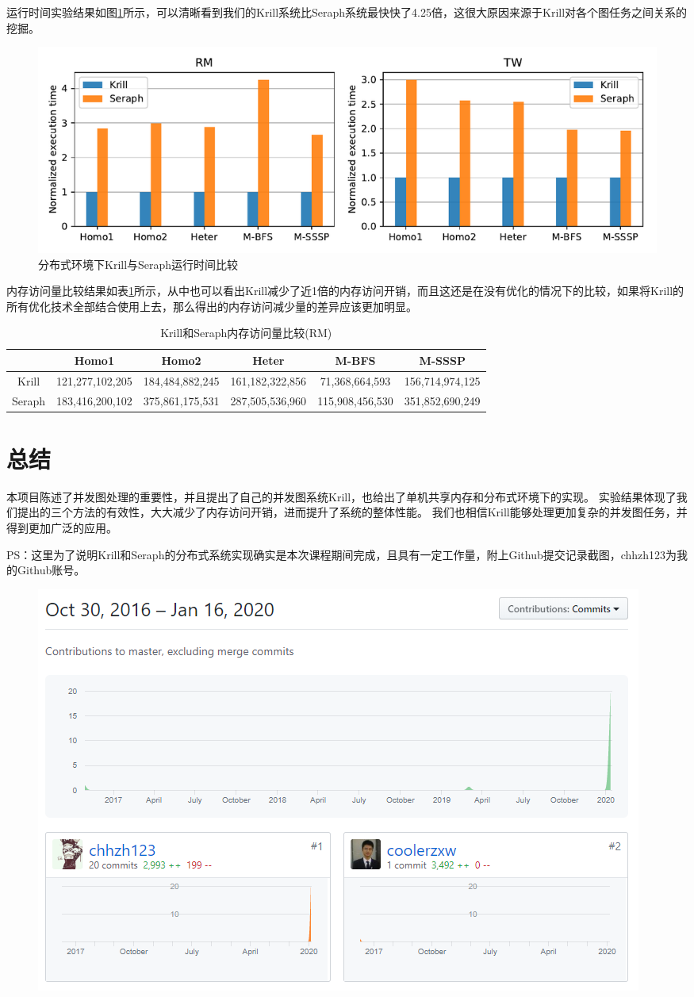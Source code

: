 \documentclass[logo,reportComp]{thesis}
\begin{document}
运行时间实验结果如图\ref{fig:distributed}所示，可以清晰看到我们的Krill系统比Seraph系统最快快了4.25倍，这很大原因来源于Krill对各个图任务之间关系的挖掘。
\begin{figure}[H]
\centering
\includegraphics[width=0.9\linewidth]{fig/distributed.pdf}
\caption{分布式环境下Krill与Seraph运行时间比较}
\label{fig:distributed}
\end{figure}

内存访问量比较结果如表\ref{tab:memory}所示，从中也可以看出Krill减少了近1倍的内存访问开销，而且这还是在没有优化的情况下的比较，如果将Krill的所有优化技术全部结合使用上去，那么得出的内存访问减少量的差异应该更加明显。
\begin{table}[H]
\caption{Krill和Seraph内存访问量比较(RM)}
\label{tab:memory}
\begin{tabular}{cccccc}\hline
& \textbf{Homo1} & \textbf{Homo2} & \textbf{Heter} & \textbf{M-BFS} & \textbf{M-SSSP}\\\hline
Krill & 121,277,102,205 & 184,484,882,245 & 161,182,322,856 & 71,368,664,593 & 156,714,974,125\\
Seraph & 183,416,200,102 & 375,861,175,531 & 287,505,536,960 & 115,908,456,530 & 351,852,690,249\\\hline
\end{tabular}
\end{table}

\section{总结}
本项目陈述了并发图处理的重要性，并且提出了自己的并发图系统Krill，也给出了单机共享内存和分布式环境下的实现。
实验结果体现了我们提出的三个方法的有效性，大大减少了内存访问开销，进而提升了系统的整体性能。
我们也相信Krill能够处理更加复杂的并发图任务，并得到更加广泛的应用。

\bigskip
PS：这里为了说明Krill和Seraph的分布式系统实现确实是本次课程期间完成，且具有一定工作量，附上Github提交记录截图，chhzh123为我的Github账号。
\begin{figure}[H]
\centering
\includegraphics[width=0.8\linewidth]{fig/github.png}
\end{figure}
\end{document}
